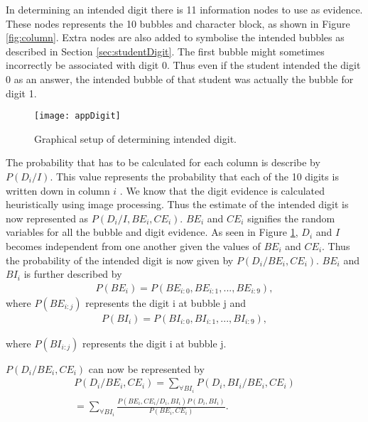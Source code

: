In determining an intended digit there is 11 information nodes to use as evidence. These nodes represents the 10 bubbles and character block, as shown in Figure \ref{fig:column}. Extra nodes are also added to symbolise the intended bubbles as described in Section \ref{sec:studentDigit}. The first bubble might sometimes incorrectly be associated with digit 0. Thus even if the student intended the digit 0 as an answer, the intended bubble of that student was actually the bubble for digit 1.

\begin{figure}
  \centering
  \texttt{[image: appDigit]}\\
  \caption{Graphical setup of determining intended digit.}
  \label{fig:appDigit}
\end{figure}

The probability that has to be calculated for each column is describe by $P(D_i/I)$. This value represents the probability that each of the 10 digits is written down in column $i$ . We know that the digit evidence is calculated heuristically using image processing. Thus the estimate of the intended digit is now represented as $P(D_i/I,BE_i,CE_i)$. $BE_i$ and $CE_i$ signifies the random variables for all the bubble and digit evidence. As seen in Figure \ref{fig:appDigit}, $D_i$ and $I$ becomes independent from one another given the values of $BE_i$ and $CE_i$. Thus the probability of the intended digit is now given by $P(D_i/BE_i,CE_i)$.
$BE_i$ and $BI_i$ is further described by 
\begin{align}
  P(BE_i) =  P(BE_{i:0},BE_{i:1},...,BE_{i:9}),
\label{eqn:ansIndep}
\end{align}
where  $P(BE_{i:j})$ represents the digit i at bubble j and
\begin{align}
  P(BI_i) =  P(BI_{i:0},BI_{i:1},...,BI_{i:9}),
\label{eqn:ansIndep}
\end{align}

where  $P(BI_{i:j})$ represents the digit i at bubble j.

$P(D_i/BE_i,CE_i)$ can now be represented by
\begin{align}
  P(D_i/BE_i,CE_i)	=  \sum_{\forall BI_i}^{}  P(D_i,BI_i/BE_i,CE_i)\\
  					=  \sum_{\forall BI_i}^{}  \frac{P(BE_i,CE_i/D_i,BI_i)P(D_i,BI_i)}{P(BE_i,CE_i)}.
\label{eqn:ansEqn2}
\end{align}

